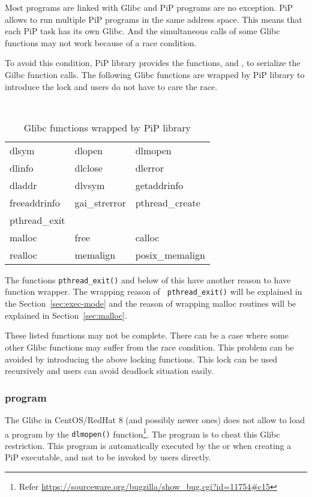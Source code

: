 Most programs are linked with Glibc and PiP programs are no
exception. PiP allows to run multiple PiP programs in the same address
space. This means that each PiP task has its own Glibc. And the
simultaneous calls of some Glibc functions may not work because of a
race condition. 

To avoid this condition, PiP library provides the functions,
 and , to 
serialize the Gilbc function calls. The following Glibc functions are
wrapped by PiP library to introduce the lock and users do not have to
care the race. 

\begin{table}[ht]
  \centering
  \caption{Glibc functions wrapped by PiP library}
  \vspace{3mm}
  \tt
  \begin{tabular}{lll}
    \hline
    dlsym	&
    dlopen	&
    dlmopen	\\
    dlinfo	&
    dlclose	&
    dlerror	\\
    dladdr	&
    dlvsym	&
    getaddrinfo	\\
    freeaddrinfo &
    gai_strerror &
    pthread_create \\
    \hline
    pthread_exit \\
    \hline
    malloc 	&
    free	&
    calloc	\\
    realloc	&
    memalign 	&
    posix_memalign \\
    \hline
  \end{tabular}
\end{table}

The functions {\tt pthread\_exit()} and below of this have another
reason to have function wrapper. The wrapping reason of {\tt
  pthread\_exit()} will be explained in the
Section~\ref{sec:exec-mode} and the reason of wrapping malloc routines
will be explained in Section~\ref{sec:malloc}. 

These listed functions may not be complete. There can
be a case where some other Glibc functions may suffer from the
race condition. This problem can be avoided by introducing the above
locking functions. This lock can be used recursively and users can
avoid deadlock situation easily. 

\subsubsection{ program}

The Glibc in CentOS/RedHat 8 (and possibly newer ones) does not allow
to load a program by the {\tt dlmopen()} function\footnote{Refer
\url{https://sourceware.org/bugzilla/show_bug.cgi?id=11754\#c15}}. The
 program is to cheat this Glibc restriction. This
program is automatically executed by the  or
 when creating a PiP executable, and not to be invoked
by users directly.

